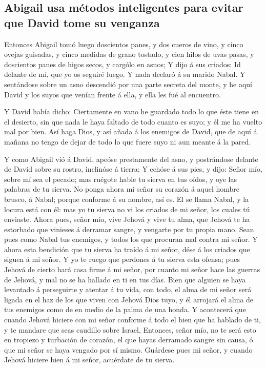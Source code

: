 \hypertarget{abigail-usa-muxe9todos-inteligentes-para-evitar-que-david-tome-su-venganza}{%
\subsection{Abigail usa métodos inteligentes para evitar que David tome
su
venganza}\label{abigail-usa-muxe9todos-inteligentes-para-evitar-que-david-tome-su-venganza}}

 Entonces Abigail tomó luego doscientos panes, y dos
cueros de vino, y cinco ovejas guisadas, y cinco medidas de grano
tostado, y cien hilos de uvas pasas, y doscientos panes de higos secos,
y cargólo en asnos;  Y dijo á sus criados: Id delante de
mí, que yo os seguiré luego. Y nada declaró á su marido Nabal.
 Y sentándose sobre un asno descendió por una parte
secreta del monte, y he aquí David y los suyos que venían frente á ella,
y ella les fué al encuentro.

 Y David había dicho: Ciertamente en vano he guardado
todo lo que éste tiene en el desierto, sin que nada le haya faltado de
todo cuanto es suyo; y él me ha vuelto mal por bien.  Así
haga Dios, y así añada á los enemigos de David, que de aquí á mañana no
tengo de dejar de todo lo que fuere suyo ni aun meante á la pared.

 Y como Abigail vió á David, apeóse prestamente del asno,
y postrándose delante de David sobre su rostro, inclinóse á tierra;
 Y echóse á sus pies, y dijo: Señor mío, sobre mí sea el
pecado; mas ruégote hable tu sierva en tus oídos, y oye las palabras de
tu sierva.  No ponga ahora mi señor su corazón á aquel
hombre brusco, á Nabal; porque conforme á su nombre, así es. El se llama
Nabal, y la locura está con él: mas yo tu sierva no vi los criados de mi
señor, los cuales tú enviaste.  Ahora pues, señor mío,
vive Jehová y vive tu alma, que Jehová te ha estorbado que vinieses á
derramar sangre, y vengarte por tu propia mano. Sean pues como Nabal tus
enemigos, y todos los que procuran mal contra mi señor. 
Y ahora esta bendición que tu sierva ha traído á mi señor, dése á los
criados que siguen á mi señor.  Y yo te ruego que
perdones á tu sierva esta ofensa; pues Jehová de cierto hará casa firme
á mi señor, por cuanto mi señor hace las guerras de Jehová, y mal no se
ha hallado en ti en tus días.  Bien que alguien se haya
levantado á perseguirte y atentar á tu vida, con todo, el alma de mi
señor será ligada en el haz de los que viven con Jehová Dios tuyo, y él
arrojará el alma de tus enemigos como de en medio de la palma de una
honda.  Y acontecerá que cuando Jehová hiciere con mi
señor conforme á todo el bien que ha hablado de ti, y te mandare que
seas caudillo sobre Israel,  Entonces, señor mío, no te
será esto en tropiezo y turbación de corazón, el que hayas derramado
sangre sin causa, ó que mi señor se haya vengado por sí mismo. Guárdese
pues mi señor, y cuando Jehová hiciere bien á mi señor, acuérdate de tu
sierva.

